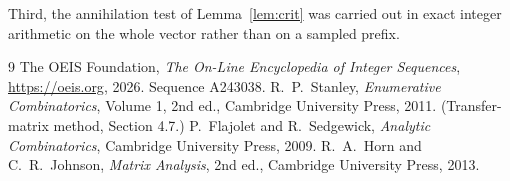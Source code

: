 \documentclass[11pt,a4paper]{article}
\theoremstyle{plain}
\theoremstyle{definition}
\begin{document}
Third, the annihilation test of Lemma~\ref{lem:crit} was carried out in exact integer
arithmetic on the whole vector rather than on a sampled prefix.

\begin{thebibliography}{9}
 The OEIS Foundation, \emph{The On-Line Encyclopedia of Integer
Sequences}, \url{https://oeis.org}, 2026. Sequence A243038.
 R.~P.~Stanley, \emph{Enumerative Combinatorics}, Volume 1, 2nd ed.,
Cambridge University Press, 2011. (Transfer-matrix method, Section 4.7.)
 P.~Flajolet and R.~Sedgewick, \emph{Analytic Combinatorics}, Cambridge
University Press, 2009.
 R.~A.~Horn and C.~R.~Johnson, \emph{Matrix Analysis}, 2nd ed., Cambridge
University Press, 2013.
\end{thebibliography}
\end{document}

